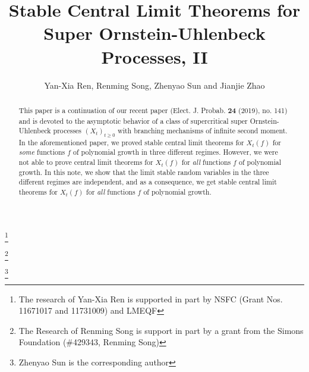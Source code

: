 \documentclass[12pt,a4paper]{amsart}
\theoremstyle{plain}
\theoremstyle{definition}
\numberwithin{equation}{section}
\begin{document}
\title
[stable CLT for super-OU processes, II]
{Stable Central Limit Theorems for Super Ornstein-Uhlenbeck Processes, II}
\author
[Y.-X. Ren, R. Song, Z. Sun and J. Zhao]
{Yan-Xia Ren, Renming Song, Zhenyao Sun and Jianjie Zhao}
\address{
  Yan-Xia Ren \\
  LMAM School of Mathematical Sciences \& Center for Statistical Science \\
  Peking University \\
  Beijing 100871, P. R. China}
\thanks{The research of Yan-Xia Ren is supported in part by NSFC (Grant Nos. 11671017  and 11731009) and LMEQF}
\address{
  Renming Song \\
  Department of Mathematics \\
  University of Illinois at Urbana-Champaign \\
  Urbana, IL 61801, USA}
\thanks{The Research of Renming Song is support in part by a grant from the Simons Foundation (\#429343, Renming Song)}
\address{
  Zhenyao Sun \\
  Faculty of Industrial Engineering and Management\\
  Technion, Israel Institute of Technology \\
  Haifa 3200003, Israel}
\thanks{Zhenyao Sun is the corresponding author}
\address{
  Jianjie Zhao \\
  School of Mathematical Sciences \\
  Peking University \\
  Beijing 100871, P. R. China}

\begin{abstract}
This paper is a continuation of our recent paper (Elect. J. Probab. \textbf{24} (2019), no. 141) and is devoted to the asymptotic behavior of a class of supercritical super Ornstein-Uhlenbeck processes $(X_t)_{t\geq 0}$ with branching mechanisms of infinite second moment. In the aforementioned paper, we proved stable central limit theorems for  $X_t(f) $ for {\it some} functions $f$ of polynomial growth in three different regimes. However, we were not able to prove central limit theorems for $X_t(f) $ for {\it all} functions $f$ of polynomial growth. In this note, we show that the limit stable random variables in the three different regimes are independent, and as a consequence, we get stable central limit theorems for  $X_t(f) $ for {\it all} functions $f$ of polynomial growth.
\end{abstract}
\maketitle
\end{document}
